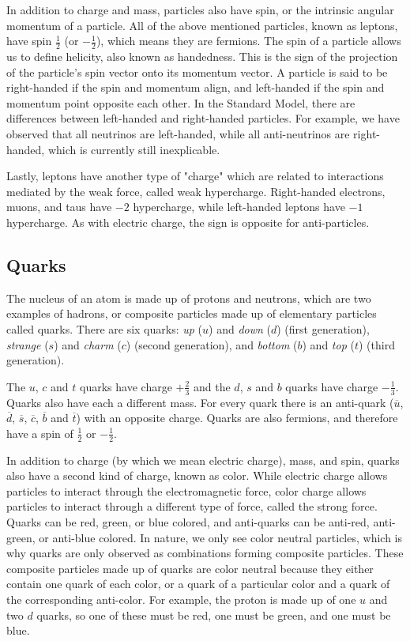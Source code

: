 In addition to charge and mass, particles also have spin, or the intrinsic angular momentum of a particle. All of the above mentioned particles, known as leptons, have spin $\frac{1}{2}$ (or $-\frac{1}{2}$), which means they are fermions. The spin of a particle allows us to define helicity, also known as handedness. This is the sign of the projection of the particle's spin vector onto its momentum vector. A particle is said to be right-handed if the spin and momentum align, and left-handed if the spin and momentum point opposite each other. In the Standard Model, there are differences between left-handed and right-handed particles. For example, we have observed that all neutrinos are left-handed, while all anti-neutrinos are right-handed, which is currently still inexplicable. 

Lastly, leptons have another type of "charge" which are related to interactions mediated by the weak force, called weak hypercharge. Right-handed electrons, muons, and taus have $-2$ hypercharge, while left-handed leptons have $-1$ hypercharge. As with electric charge, the sign is opposite for anti-particles.

\subsection{Quarks}
The nucleus of an atom is made up of protons and neutrons, which are two examples of hadrons, or composite particles made up of elementary particles called quarks. There are six quarks: \textit{up} ($u$) and \textit{down} ($d$) (first generation), \textit{strange} ($s$) and \textit{charm} ($c$) (second generation), and \textit{bottom} ($b$) and \textit{top} ($t$) (third generation).

The $u$, $c$ and $t$ quarks have charge $+\frac{2}{3}$ and the $d$, $s$ and $b$ quarks have charge $-\frac{1}{3}$. Quarks also have each a different mass. For every quark there is an anti-quark ($\overline{u}$, $\overline{d}$, $\overline{s}$, $\overline{c}$, $\overline{b}$ and $\overline{t}$) with an opposite charge. Quarks are also fermions, and therefore have a spin of $\frac{1}{2}$ or $-\frac{1}{2}$.

In addition to charge (by which we mean electric charge), mass, and spin, quarks also have a second kind of charge, known as color. While electric charge allows particles to interact through the electromagnetic force, color charge allows particles to interact through a different type of force, called the strong force. Quarks can be red, green, or blue colored, and anti-quarks can be anti-red, anti-green, or anti-blue colored. In nature, we only see color neutral particles, which is why quarks are only observed as combinations forming composite particles. These composite particles made up of quarks are color neutral because they either contain one quark of each color, or a quark of a particular color and a quark of the corresponding anti-color. For example, the proton is made up of one $u$ and two $d$ quarks, so one of these must be red, one must be green, and one must be blue.

